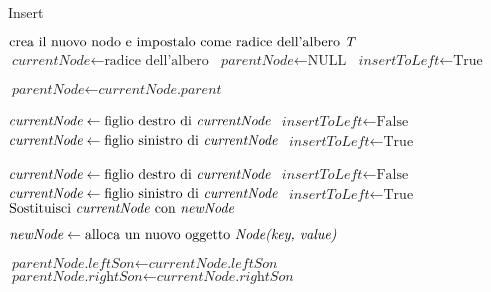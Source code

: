 \documentclass[10pt,a4paper,titlepage]{article}
\begin{document}
\begin{center}
\begin{algorithm}
\caption{Insert}\label{alg:testc}
\begin{algorithmic}[1]

	\State $\text{crea il nuovo nodo e impostalo come radice dell'albero \textit{T}}$
	\State \Return
\Else
	\State $\textit{currentNode} \gets \text{radice dell'albero}$
	\State $\textit{parentNode} \gets \text{NULL}$
	\State $\textit{insertToLeft} \gets \text{True}$
	
	
	\State $\textit{parentNode} \gets \textit{currentNode.parent}$	
	
		
			\State $\textit{currentNode} \gets \text{figlio destro di \textit{currentNode}}$
			\State $\textit{insertToLeft} \gets \text{False}$
		\Else
			\State $\textit{currentNode} \gets \text{figlio sinistro di \textit{currentNode}}$
			\State $\textit{insertToLeft} \gets \text{True}$
		\EndIf
	
	\Else
			\State $\textit{currentNode} \gets \text{figlio destro di \textit{currentNode}}$
			\State $\textit{insertToLeft} \gets \text{False}$
			\State $\textit{currentNode} \gets \text{figlio sinistro di \textit{currentNode}}$
			\State $\textit{insertToLeft} \gets \text{True}$
		\Else
			\State $\text{Sostituisci \textit{currentNode} con \textit{newNode}}$
			\State \Return
		\EndIf
	
	\EndIf
	\EndWhile

\State $\textit{newNode} \gets \text{alloca un nuovo oggetto \textit{Node(key, value)}}$

 	\State $\textit{parentNode.leftSon} \gets \textit{currentNode.leftSon}$
\Else 	
 	\State $\textit{parentNode.rightSon} \gets \textit{currentNode.rightSon}$
\EndIf
\EndIf
\State \Return 

\EndFunction
\end{algorithmic}
\end{algorithm}
\end{center}
\newpage
\end{document}

